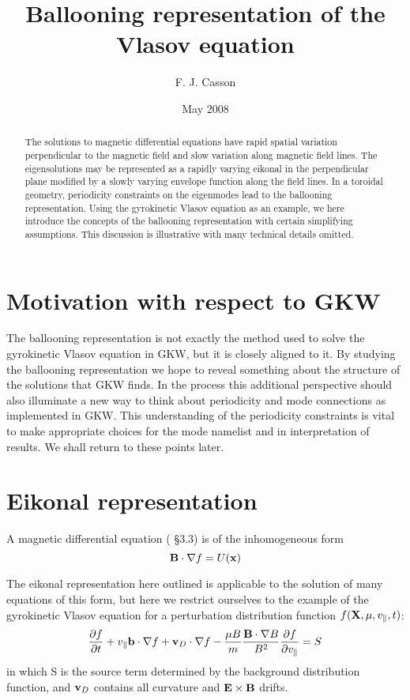 \documentclass[a4paper,11pt]{article}
\title{Ballooning representation of the Vlasov equation}
\author{F. J. Casson}
\date{May 2008}
\begin{document}
\maketitle

\begin{abstract}

The solutions to magnetic differential equations have rapid spatial variation perpendicular to the magnetic field and slow variation along magnetic field lines. The eigensolutions may be represented as a rapidly varying eikonal in the perpendicular plane modified by a slowly varying envelope function along the field lines. In a toroidal geometry, periodicity constraints on the eigenmodes lead to the ballooning representation.  Using the gyrokinetic Vlasov equation as an example, we here introduce the concepts of the ballooning representation with certain simplifying assumptions.  This discussion is illustrative with many technical details omitted.

\end{abstract}

\section{Motivation with respect to GKW}
The ballooning representation is not exactly the method used to solve the gyrokinetic Vlasov equation in GKW, but it is closely aligned to it.  By studying the ballooning representation we hope to reveal something about the structure of the solutions that GKW finds.  In the process this additional perspective should also illuminate a new way to think about periodicity and mode connections as implemented in GKW. This understanding of the periodicity constraints is vital to make appropriate choices for the mode namelist and in interpretation of results.  We shall return to these points later.

\section{Eikonal representation}

A magnetic differential equation (\cite{H+M} \S 3.3)  is of the inhomogeneous form
\begin{equation}
 {\bf B}\cdot \nabla f = U({\bf x})
\end{equation}

The eikonal representation here outlined is applicable to the solution of many equations of this form, but here we restrict ourselves to the example of the gyrokinetic Vlasov equation for a perturbation distribution function $f({\bf X},\mu,v_\parallel, t)$:
\begin{equation}
{\partial f \over \partial t} + v_\parallel {\bf b}\cdot \nabla f + {\bf v}_{D} \cdot \nabla f -{\mu B \over m}{{\bf B}\cdot \nabla B \over B^2}{\partial f \over \partial v_\parallel} = S
\label{eq.gyro}
\end{equation}
in which S is the source term determined by the background distribution function, and ${\bf v}_{D}$ contains all curvature and ${\bf E} \times {\bf B}$ drifts.
 
\end{document}
